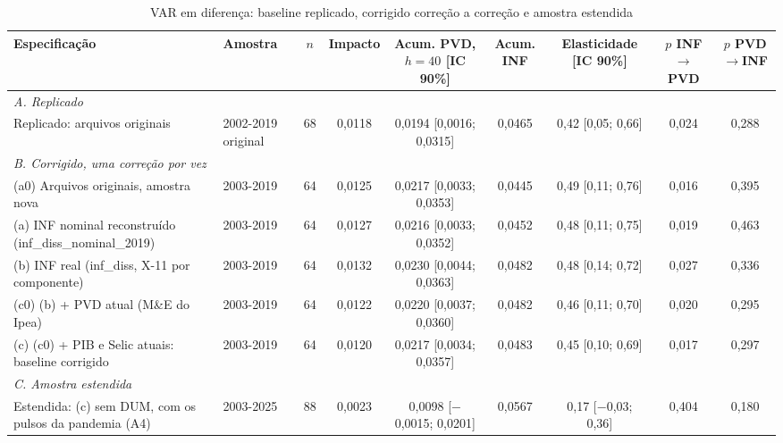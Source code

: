 \begin{table}[htbp]
\centering
\caption{VAR em diferen\c{c}a: baseline replicado, corrigido corre\c{c}\~ao a corre\c{c}\~ao e amostra estendida}
\label{tab:a6_var_base}
\scriptsize
\begin{adjustbox}{max width=\linewidth}
\begin{tabular}{p{4.3cm}lccccccc}
\toprule
Especifica\c{c}\~ao & Amostra & $n$ & Impacto & Acum. PVD, $h=40$ [IC 90\%] & Acum. INF & Elasticidade [IC 90\%] & $p$ INF$\to$PVD & $p$ PVD$\to$INF \\
\midrule
\multicolumn{9}{l}{\textit{A. Replicado}} \\
Replicado: arquivos originais & 2002-2019 original & 68 & 0{,}0118 & 0{,}0194 [0{,}0016; 0{,}0315] & 0{,}0465 & 0{,}42 [0{,}05; 0{,}66] & 0{,}024 & 0{,}288 \\
\multicolumn{9}{l}{\textit{B. Corrigido, uma corre\c{c}\~ao por vez}} \\
(a0) Arquivos originais, amostra nova & 2003-2019 & 64 & 0{,}0125 & 0{,}0217 [0{,}0033; 0{,}0353] & 0{,}0445 & 0{,}49 [0{,}11; 0{,}76] & 0{,}016 & 0{,}395 \\
(a) INF nominal reconstru\'ido (inf\_diss\_nominal\_2019) & 2003-2019 & 64 & 0{,}0127 & 0{,}0216 [0{,}0033; 0{,}0352] & 0{,}0452 & 0{,}48 [0{,}11; 0{,}75] & 0{,}019 & 0{,}463 \\
(b) INF real (inf\_diss, X-11 por componente) & 2003-2019 & 64 & 0{,}0132 & 0{,}0230 [0{,}0044; 0{,}0363] & 0{,}0482 & 0{,}48 [0{,}14; 0{,}72] & 0{,}027 & 0{,}336 \\
(c0) (b) + PVD atual (M\&E do Ipea) & 2003-2019 & 64 & 0{,}0122 & 0{,}0220 [0{,}0037; 0{,}0360] & 0{,}0482 & 0{,}46 [0{,}11; 0{,}70] & 0{,}020 & 0{,}295 \\
(c) (c0) + PIB e Selic atuais: baseline corrigido & 2003-2019 & 64 & 0{,}0120 & 0{,}0217 [0{,}0034; 0{,}0357] & 0{,}0483 & 0{,}45 [0{,}10; 0{,}69] & 0{,}017 & 0{,}297 \\
\multicolumn{9}{l}{\textit{C. Amostra estendida}} \\
Estendida: (c) sem DUM, com os pulsos da pandemia (A4) & 2003-2025 & 88 & 0{,}0023 & 0{,}0098 [$-$0{,}0015; 0{,}0201] & 0{,}0567 & 0{,}17 [$-$0{,}03; 0{,}36] & 0{,}404 & 0{,}180 \\
\bottomrule

\end{tabular}
\end{adjustbox}
\end{table}
